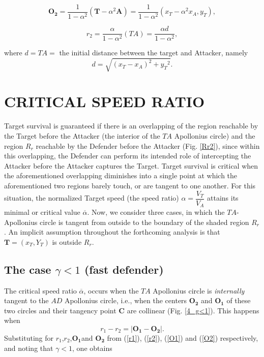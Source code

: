 \documentclass[final,5p,times,twocolumn]{elsarticle}
\begin{document}
\begin{equation}
\boldsymbol{O_{2}} =\dfrac{1}{1-\alpha^{2}}(\boldsymbol{T}-\alpha^{2} \boldsymbol{A}) =\dfrac{1}{1-\alpha^{2}}(x_{T}-\alpha^{2} x_{A},y_{T}),
\label{O2}
\end{equation}

\begin{equation}
r_{2} =\dfrac{\alpha}{1-\alpha^{2}}(TA)
 = \dfrac{\alpha d}{1-\alpha^{2}},
 \label{r2}
\end{equation}

where $d=TA=$ the initial distance between the target and Attacker, namely
\begin{equation}
d=\sqrt{(x_{T}-x_{A})^{2}+{y_{T}}^{2}}.
\label{d}
\end{equation}


\section{CRITICAL SPEED RATIO}
Target survival is guaranteed if there is an overlapping of the region reachable by the Target before the Attacker (the interior of the $TA$ Apollonius circle) and the region $R_r$ reachable by the Defender before the Attacker (Fig. \ref{Rr2}), since within this overlapping, the Defender can perform its intended role of intercepting the Attacker before the Attacker captures the Target. Target survival is critical when the aforementioned overlapping diminishes into a single point at which the aforementioned two regions barely touch, or are tangent to one another.
For this situation, the normalized Target speed (the speed ratio) $\alpha=\dfrac{V_{T}}{V_{A}}$ attains its minimal or critical value $\overline{\alpha}$. Now, we consider three cases, in which the $TA$-Apollonius circle is tangent from outside to the boundary of the shaded region $R_r$. An implicit assumption throughout the forthcoming analysis is that $\boldsymbol{T}=(x_T , Y_T)$ is outside $R_r$. 
\subsection{The case $\gamma<1$ (fast defender)}
The critical speed ratio $\overline{\alpha}$, occurs when the $TA$ Apollonius circle is \textit{internally} tangent to the $AD$ Apollonius circle, i.e., when the centers $\boldsymbol{O_{2}}$ and $\boldsymbol{O_{1}}$ of these two circles and their tangency point $\boldsymbol{C}$ are collinear (Fig. \ref{4_g<1}). This happens when
\begin{equation}
r_{1}-r_{2}=\lvert\boldsymbol{O_{1}}-\boldsymbol{O_{2}}\rvert.
\label{dr_fd}
\end{equation}
Substituting for $r_{1}$,$r_{2}$,$\boldsymbol{O_1}$and $\boldsymbol{O_{2}}$ from (\ref{r1}), (\ref{r2}), (\ref{O1}) and (\ref{O2}) respectively, and noting that $\gamma<1$, one obtains
\end{document}
